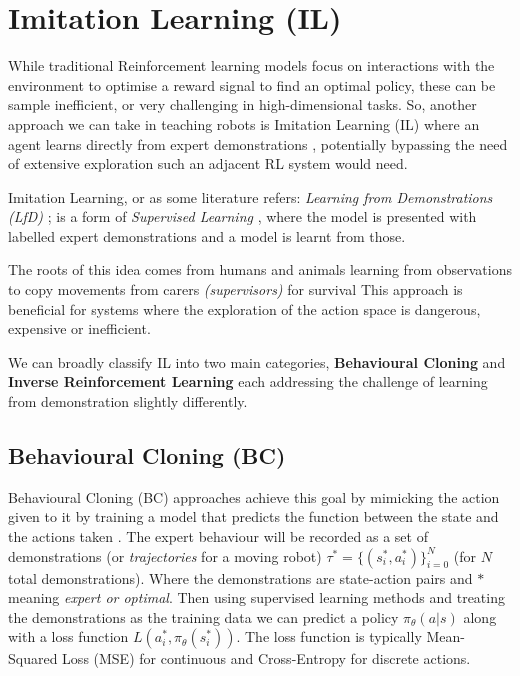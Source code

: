 \section{Imitation Learning (IL)}
\label{sec:il}
  While traditional Reinforcement learning models focus on interactions with the environment to optimise a reward signal to find an optimal policy, these can be sample inefficient, or very challenging in high-dimensional tasks. So, another approach we can take in teaching robots is Imitation Learning (IL) where an agent learns directly from expert demonstrations \cite{attia2018globaloverviewimitationlearning}, potentially bypassing the need of extensive exploration such an adjacent RL system would need.

  Imitation Learning, or as some literature refers: \emph{Learning from Demonstrations (LfD)} \cite{ARGALL2009469}; is a form of \emph{Supervised Learning} \cite{hastie2009overview,cunningham2008supervised}, where the model is presented with labelled expert demonstrations and a model is learnt from those.
  
  The roots of this idea comes from humans and animals \cite{bakker1996robot} learning from observations to copy movements from carers \emph{(supervisors)} for survival This approach is beneficial for systems where the exploration of the action space is dangerous, expensive or inefficient.

  We can broadly classify IL into two main categories, \textbf{Behavioural Cloning} and \textbf{Inverse Reinforcement Learning} each addressing the challenge of learning from demonstration slightly differently.


\subsection{Behavioural Cloning (BC)}
\label{subsec:bc}
 Behavioural Cloning (BC) approaches achieve this goal by  mimicking the action given to it by training a model that predicts the function between the state and the actions taken  \cite{pomerlau1991neco.1991.3.1.88, ross2011reductionimitationlearningstructured}. The expert behaviour will be recorded as a set of demonstrations (or \emph{trajectories} for a moving robot) $\tau^* = \lbrace(s_i^*, a_i^*)\rbrace_{i = 0}^N$ (for $N$ total demonstrations). Where the demonstrations are state-action pairs and \emph{$*$} meaning \emph{expert or optimal}.
 Then using supervised learning methods and treating the demonstrations as the training data we can predict a policy $\pi_\theta\left(a | s\right)$ along with a loss function $L \left( a_i^*, \pi_\theta\left(s_i^*\right) \right)$. The loss function is typically Mean-Squared Loss (MSE) for continuous and Cross-Entropy for discrete actions.

